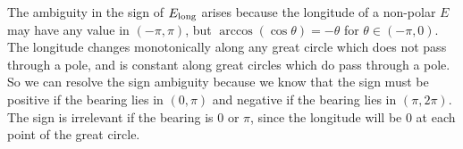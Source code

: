 \documentclass[12pt]{article}
\renewcommand\long[1]{{#1}_{\rm long}}
\begin{document}
The ambiguity in the sign of $\long E$ arises because the longitude of a
non-polar $E$ may have any value in $(-\pi, \pi)$, but
$\arccos(\cos\theta) = -\theta$ for $\theta\in(-\pi,0)$.  The longitude changes
monotonically along any great circle which does not pass through a pole, and is
constant along great circles which do pass through a pole.  So we can resolve
the sign ambiguity because we know that the sign must be positive if the bearing
lies in $(0, \pi)$ and negative if the bearing lies in $(\pi, 2\pi)$.  The sign
is irrelevant if the bearing is $0$ or $\pi$, since the longitude will be $0$ at
each point of the great circle.
\end{document}
